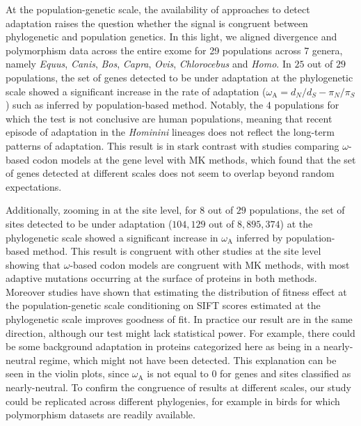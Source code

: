 \documentclass{article}
\newcommand{\dn}{d_N}
\newcommand{\ds}{d_S}
\newcommand{\dnds}{\dn / \ds}
\newcommand{\pn}{\pi_N}
\newcommand{\ps}{\pi_S}
\newcommand{\pnps}{\pn / \ps}
\begin{document}
    At the population-genetic scale, the availability of approaches to detect adaptation\cite{mcdonald_adaptative_1991, messer_frequent_2013} raises the question whether the signal is congruent between phylogenetic and population genetics.
    In this light, we aligned divergence and polymorphism data across the entire exome for 29 populations across 7 genera, namely \textit{Equus}, \textit{Canis}, \textit{Bos}, \textit{Capra}, \textit{Ovis}, \textit{Chlorocebus} and \textit{Homo}.
    In $25$ out of $29$ populations, the set of genes detected to be under adaptation at the phylogenetic scale showed a significant increase in the rate of adaptation ($\omega_{\mathrm{A}} = \dnds - \pnps$) such as inferred by population-based method.
    Notably, the $4$ populations for which the test is not conclusive are human populations, meaning that recent episode of adaptation in the \textit{Hominini} lineages does not reflect the long-term patterns of adaptation.
    This result is in stark contrast with studies comparing $\omega$-based codon models at the gene level with MK methods, which found that the set of genes detected at different scales does not seem to overlap beyond random expectations\cite{chen_two_2021}.

    Additionally, zooming in at the site level, for $8$ out of $29$ populations, the set of sites detected to be under adaptation ($104,129$ out of $8,895,374$) at the phylogenetic scale showed a significant increase in $\omega_{\mathrm{A}}$ inferred by population-based method.
    This result is congruent with other studies at the site level showing that $\omega$-based codon models are congruent with MK methods, with most adaptive mutations occurring at the surface of proteins in both methods\cite{moutinho_impact_2019}.
    Moreover studies have shown that estimating the distribution of fitness effect at the population-genetic scale conditioning on SIFT scores estimated at the phylogenetic scale improves goodness of fit\cite{chen_hunting_2021}.
    In practice our result are in the same direction, although our test might lack statistical power.
    For example, there could be some background adaptation in proteins categorized here as being in a nearly-neutral regime, which might not have been detected.
    This explanation can be seen in the violin plots, since $\omega_{\mathrm{A}}$ is not equal to $0$ for genes and sites classified as nearly-neutral.
    To confirm the congruence of results at different scales, our study could be replicated across different phylogenies, for example in birds for which polymorphism datasets are readily available.
\end{document}
